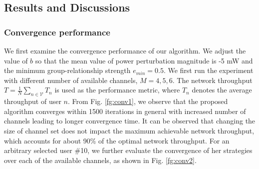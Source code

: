 \subsection{Results and Discussions}
\subsubsection{Convergence performance}
We first examine the convergence performance of our algorithm. We adjust the value of $b$ so that the mean value of power perturbation magnitude is -5 mW and the minimum group-relationship strength $e_{min}=0.5$. We first run the experiment with different number of available channels, $M=4,5,6$. The network throughput $T=\frac{1}{N}\sum_{n\in\mathcal{V}} T_n$ is used as the performance metric, where $T_n$ denotes the average throughput of user $n$. From Fig. \ref{fg:conv1}, we observe that the proposed algorithm converges within 1500 iterations in general with increased number of channels leading to longer convergence time. It can be observed that changing the size of channel set does not impact the maximum achievable network throughput, which accounts for about 90\% of the optimal network throughput. For an arbitrary selected user \#10, we further evaluate the convergence of her strategies over each of the available channels, as shown in Fig. \ref{fg:conv2}.

